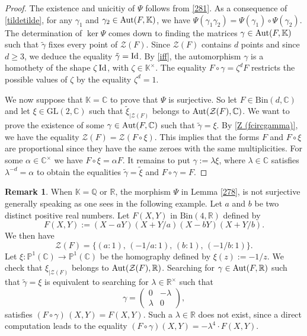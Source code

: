 \documentclass[10pt]{article}
\theoremstyle{definition}
\newtheorem{remark}[theorem]{Remark}
\numberwithin{equation}{section}
\newcommand {\Q}{{\mathbb{Q}}}
\newcommand {\C}{{\mathbb{C}}}
\newcommand {\PP}{{\mathbb{P}}}
\newcommand {\R}{{\mathbb{R}}}
\newcommand {\K}{{\mathbb{K}}}
\newcommand{\Bin}{\mathrm {Bin}}
\newcommand{\GL}{\mathrm {GL}}
\begin{document}
\begin{proof} The existence and unicitiy of $\Psi$ follows from \eqref{281}.
As a consequence of \eqref{tildetilde}, for any $\gamma_1$ and $\gamma_2 \in 
{\rm Aut}(F, \K)$, we have $\Psi (\gamma_1\gamma_2 ) =\Psi (\gamma_1)\circ\Psi (\gamma_2)$. The determination of $ \ker \Psi$ comes down to finding the matrices
 $\gamma \in {\rm Aut}( F, \K)$ such that $ \tilde \gamma$ fixes every point of $\mathcal Z (F)$. Since $\mathcal Z (F)$ contains $d$ points and since $d\geqslant 3$, we deduce the equality $\tilde \gamma ={\rm Id}$. By \eqref{iff}, the automorphism $\gamma$ is a homothety of the shape $\zeta\, {\rm Id}$, with $\zeta \in \K^\times$. The equality $F\circ \gamma = \zeta^d F$ restricts the possible values of $\zeta$ by the equality $\zeta^d =1$. 
 
 We now suppose that $\K =\C$ to prove that $\Psi$ is surjective.
So let $F\in \Bin  (d,\C)$ and let $\xi \in {\GL}(2,\C)$ such that $\tilde \xi_{\vert {\mathcal Z}(F)}$ belongs to ${\rm Aut} ({\mathcal Z }(F), \C)$. We want to prove the existence of some $\gamma \in {\rm Aut}(F, \C)$ such that $\tilde \gamma =\xi$. By \eqref{Z (fcircgamma)}, we have the equality ${\mathcal Z} (F) = {\mathcal Z}(F\circ \xi)$.
This implies that the forms $F$ and $F\circ \xi$ are proportional since they have the same zeroes with
the same multiplicities. For some $\alpha \in \C^\times$ we have $F\circ \xi = \alpha F$. It remains to put $\gamma := \lambda \xi$, where $\lambda \in \C $ satisfies $\lambda^{-d }= \alpha$ to obtain the equalities 
$\tilde \gamma = \tilde \xi$ and $F\circ \gamma = F$.
\end{proof}
\begin{remark}
\label{remarque3} 
 When $\K= \Q$ or $\R$, the morphism $\Psi$ in Lemma \ref{278}, is not surjective generally speaking as one sees in the following example. Let $a$ and $b$ be two distinct positive real numbers. Let $ F(X,Y)$ in $\Bin (4, \R)$ defined by 
 \[
F(X,Y) := (X-aY)(X+Y/a)(X-bY)(X+Y/b).
\]
We then have 
\[
\mathcal Z (F)= \bigl\{ (a:1), \, (-1/a:1),\, (b:1),\, (-1/b: 1)
\bigr\}. 
\]
Let $\xi : \PP^1 (\C) \rightarrow \PP^1 (\C)$ be the homography defined by $\xi( z):= -1/z$. We check that $\xi_{\vert \mathcal Z (F)}$ belongs to ${\rm Aut}(\mathcal Z (F), \R)$. Searching for $\gamma \in {\rm Aut}(F, \R)$ such that $\tilde \gamma = \xi$ is equivalent to searching for $\lambda \in \R^\times$ such that 
\[
\gamma =
\begin{pmatrix}
0 &-\lambda\\
\lambda & 0
\end{pmatrix},
\]
satisfies $(F\circ \gamma)\, (X,Y) =F(X,Y)$. Such a $\lambda\in \R$ does not exist, since a direct computation leads to the equality $(F\circ \gamma) (X, Y) =- \lambda^4 \cdot F (X,Y)$.
\end{remark}
\end{document}
